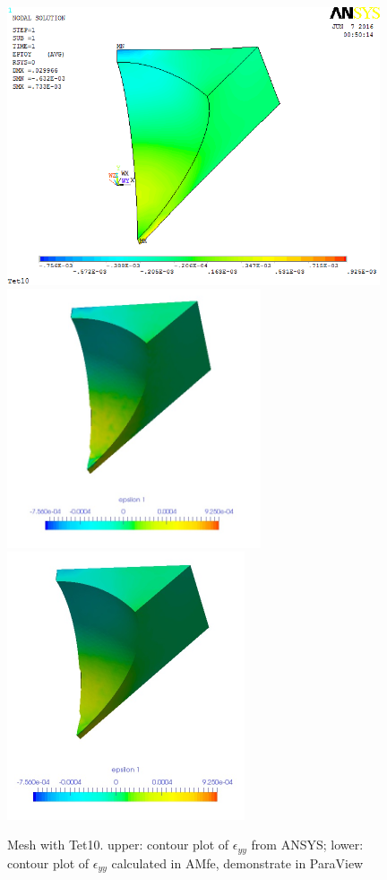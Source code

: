 \begin{figure}[htbp]
	\begin{center}
		\includegraphics[width=11cm,clip]{Tet10_Eyy.png} 	
		\includegraphics[width=7.5cm,clip]{Tet10_Eyy_PD.png} 		
		\includegraphics[width=7cm,clip]{Tet10_Eyy_P.png} 		
		\caption{Mesh with Tet10. upper: contour plot of $\epsilon_{yy}$ from ANSYS; lower: contour plot of $\epsilon_{yy}$ calculated in AMfe, demonstrate in ParaView} \label{fig: Tet10_Eyy}
	\end{center}
\end{figure}
\clearpage 

